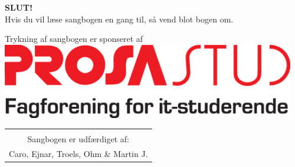 \newpage
\pagestyle{empty}
\begin{center}
{\Huge \textbf{SLUT!}}\\
\vspace{6cm}
{\large Hvis du vil læse sangbogen en gang til, så vend blot bogen
  om.}\\

\vspace{3cm}

{\large Trykning af sangbogen er sponseret af}
\includegraphics[width=0.96\textwidth]{res/prosalogo.eps}


\begin{tabular}{c}
\vspace{3cm}
\\
Sangbogen er udfærdiget af:\\
Caro, Ejnar, Troels, Ohm \& Martin J.
\end{tabular}
\end{center}
